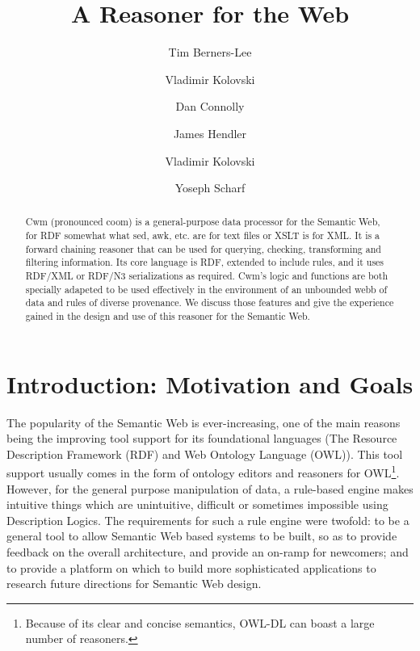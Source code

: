 \documentclass{tlp}
\begin{document}
   


\title{A Reasoner for the Web}
\author[Berners-Lee et. al.]{Tim Berners-Lee \and Vladimir Kolovski \and Dan Connolly \and James Hendler \and Vladimir Kolovski \and Yoseph Scharf}
  \maketitle
\label{firstpage}
  

    \begin{abstract}
  


\par Cwm (pronounced coom) is a general-purpose data processor for
the Semantic Web, for RDF somewhat what sed, awk, etc. are for text
files or XSLT is for XML. It is a forward chaining reasoner that
can be used for querying, checking, transforming and filtering
information. Its core language is RDF, extended to include rules,
and it uses RDF/XML or RDF/N3 serializations as required. Cwm's
logic and functions are both specially adapeted to be used
effectively in the environment of an unbounded webb of data and
rules of diverse provenance. We discuss those features and give the
experience gained in the design and use of this reasoner for the
Semantic Web.
\end{abstract}
  


\section{Introduction: Motivation and Goals}
  

\par The popularity of the Semantic Web is ever-increasing, one of
the main reasons being the improving tool support for its
foundational languages (The Resource Description Framework
(RDF)\cite{RDFC04} and Web Ontology Language
(OWL)\cite{owl}). This tool support usually comes in
the form of ontology editors and reasoners for OWL\footnote{Because of its clear and concise semantics, OWL-DL can
boast a large number of reasoners.}.  However, for the general purpose manipulation of data,
a rule-based engine makes intuitive things which are unintuitive,
difficult or sometimes impossible using Description Logics. The
requirements for such a rule engine were twofold: to be a general
tool to allow Semantic Web based systems to be built, so as to
provide feedback on the overall architecture, and provide an
on-ramp for newcomers; and to provide a platform on which to build
more sophisticated applications to research future directions for
Semantic Web design.
\end{document}
